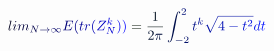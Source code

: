 \documentclass[12pt]{article}
\begin{document}
\makeatletter
\renewcommand*{\@textcolor}[3]{%
  \protect\leavevmode
  \begingroup
    \color#1{#2}#3%
  \endgroup
}
\makeatother
\begin{displaymath}
\mathcolor[RGB]{0,0,15}{\operatorname*} { \mathcolor[RGB]{0,0,30}{l} \mathcolor[RGB]{0,0,45}{i} \mathcolor[RGB]{0,0,60}{m} } _ { \mathcolor[RGB]{0,0,75}{N} \mathcolor[RGB]{0,0,90}{\to} \mathcolor[RGB]{0,0,105}{\infty} } \mathcolor[RGB]{0,0,120}{E} \mathcolor[RGB]{0,0,135}{(} \mathcolor[RGB]{0,0,150}{t} \mathcolor[RGB]{0,0,165}{r} \mathcolor[RGB]{0,0,180}{(} \mathcolor[RGB]{0,0,195}{Z} _ { \mathcolor[RGB]{0,0,210}{N} } ^ { \mathcolor[RGB]{0,0,225}{k} } \mathcolor[RGB]{0,0,240}{)} \mathcolor[RGB]{0,0,255}{)} \mathcolor[RGB]{0,15,0}{=} \mathcolor[RGB]{0,15,15}{\frac { \mathcolor[RGB]{0,15,30}{1} } { \mathcolor[RGB]{0,15,45}{2} \mathcolor[RGB]{0,15,60}{\pi} } } \mathcolor[RGB]{0,15,75}{\int} _ { \mathcolor[RGB]{0,15,90}{-} \mathcolor[RGB]{0,15,105}{2} } ^ { \mathcolor[RGB]{0,15,120}{2} } \mathcolor[RGB]{0,15,135}{t} ^ { \mathcolor[RGB]{0,15,150}{k} } \mathcolor[RGB]{0,15,165}{\sqrt { \mathcolor[RGB]{0,15,180}{4} \mathcolor[RGB]{0,15,195}{-} \mathcolor[RGB]{0,15,210}{t} ^ { \mathcolor[RGB]{0,15,225}{2} } } } \mathcolor[RGB]{0,15,240}{d} \mathcolor[RGB]{0,15,255}{t}
\end{displaymath}
\end{document}
